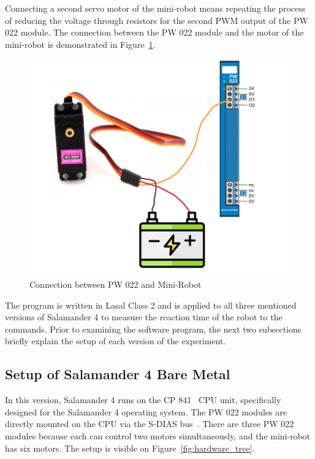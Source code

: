 \documentclass[MMR,Master,english]{style/twbook}
\begin{document}
\noindent Connecting a second servo motor of the mini-robot means repeating the process of reducing the voltage through resistors for the second PWM output of the PW 022 module. The connection between the PW 022 module and the motor of the mini-robot is demonstrated in Figure~\ref{fig:pw022_minirobot_connection}.

\begin{figure}[H]
	\centering
	\includegraphics[width=0.7\columnwidth]{img/experiment/pw022_minirobot.png}
	\caption[Connection between PW 022 and Mini-Robot]{Connection between PW 022 and Mini-Robot~\cite{MG996RDigitalServo}}
	\label{fig:pw022_minirobot_connection}
\end{figure}

\noindent The program is written in Lasal Class 2 and is applied to all three mentioned versions of Salamander 4 to measure the reaction time of the robot to the commands. Prior to examining the software program, the next two subsections briefly explain the setup of each version of the experiment.

\subsection{Setup of Salamander 4 Bare Metal}
In this version, Salamander 4 runs on the CP 841~\cite{CPUUnitsSIGMATEK} CPU unit, specifically designed for the Salamander 4 operating system. The PW 022 modules are directly mounted on the CPU via the S-DIAS bus~\cite{SDIASSIGMATEK}. There are three PW 022 modules because each can control two motors simultaneously, and the mini-robot has six motors. The setup is visible on Figure~\ref{fig:hardware_tree}.
\end{document}
